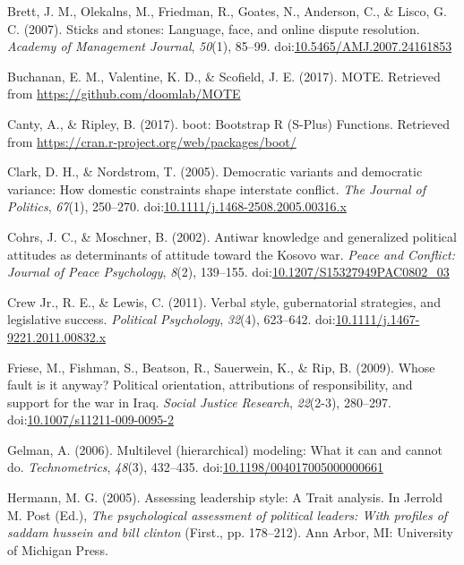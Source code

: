 \documentclass[english,man]{apa6}
\theoremstyle{definition}
\theoremstyle{definition}
\theoremstyle{definition}
\theoremstyle{remark}
\begin{document}
\hypertarget{ref-Brett2007}{}
Brett, J. M., Olekalns, M., Friedman, R., Goates, N., Anderson, C., \&
Lisco, G. C. (2007). Sticks and stones: Language, face, and online
dispute resolution. \emph{Academy of Management Journal}, \emph{50}(1),
85--99.
doi:\href{https://doi.org/10.5465/AMJ.2007.24161853}{10.5465/AMJ.2007.24161853}

\hypertarget{ref-Buchanan2017}{}
Buchanan, E. M., Valentine, K. D., \& Scofield, J. E. (2017). MOTE.
Retrieved from \url{https://github.com/doomlab/MOTE}

\hypertarget{ref-Canty2017}{}
Canty, A., \& Ripley, B. (2017). boot: Bootstrap R (S-Plus) Functions.
Retrieved from \url{https://cran.r-project.org/web/packages/boot/}

\hypertarget{ref-Clark2005}{}
Clark, D. H., \& Nordstrom, T. (2005). Democratic variants and
democratic variance: How domestic constraints shape interstate conflict.
\emph{The Journal of Politics}, \emph{67}(1), 250--270.
doi:\href{https://doi.org/10.1111/j.1468-2508.2005.00316.x}{10.1111/j.1468-2508.2005.00316.x}

\hypertarget{ref-Cohrs2002}{}
Cohrs, J. C., \& Moschner, B. (2002). Antiwar knowledge and generalized
political attitudes as determinants of attitude toward the Kosovo war.
\emph{Peace and Conflict: Journal of Peace Psychology}, \emph{8}(2),
139--155.
doi:\href{https://doi.org/10.1207/S15327949PAC0802_03}{10.1207/S15327949PAC0802\_03}

\hypertarget{ref-Crew2011}{}
Crew Jr., R. E., \& Lewis, C. (2011). Verbal style, gubernatorial
strategies, and legislative success. \emph{Political Psychology},
\emph{32}(4), 623--642.
doi:\href{https://doi.org/10.1111/j.1467-9221.2011.00832.x}{10.1111/j.1467-9221.2011.00832.x}

\hypertarget{ref-Friese2009}{}
Friese, M., Fishman, S., Beatson, R., Sauerwein, K., \& Rip, B. (2009).
Whose fault is it anyway? Political orientation, attributions of
responsibility, and support for the war in Iraq. \emph{Social Justice
Research}, \emph{22}(2-3), 280--297.
doi:\href{https://doi.org/10.1007/s11211-009-0095-2}{10.1007/s11211-009-0095-2}

\hypertarget{ref-Gelman2006}{}
Gelman, A. (2006). Multilevel (hierarchical) modeling: What it can and
cannot do. \emph{Technometrics}, \emph{48}(3), 432--435.
doi:\href{https://doi.org/10.1198/004017005000000661}{10.1198/004017005000000661}

\hypertarget{ref-Hermann2005}{}
Hermann, M. G. (2005). Assessing leadership style: A Trait analysis. In
Jerrold M. Post (Ed.), \emph{The psychological assessment of political
leaders: With profiles of saddam hussein and bill clinton} (First., pp.
178--212). Ann Arbor, MI: University of Michigan Press.
\end{document}

